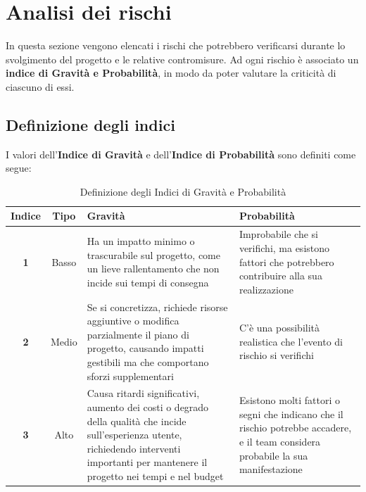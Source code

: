 \documentclass{article}
\begin{document}
\section{Analisi dei rischi}
In questa sezione vengono elencati i rischi che potrebbero verificarsi durante lo svolgimento del progetto e le relative contromisure. Ad ogni rischio è associato un \textbf{indice di Gravità e Probabilità},
in modo da poter valutare la criticità di ciascuno di essi.
\subsection{Definizione degli indici}
I valori dell'\textbf{Indice di Gravità} e dell'\textbf{Indice di Probabilità} sono definiti come segue:
\begin{table}[h!]
    \centering
    \begin{tabular}{|c|c|p{6cm}|p{6cm}|}
        \hline
        \textbf{Indice} & \textbf{Tipo} & \textbf{Gravità} & \textbf{Probabilità} \\
        \hline
        \textbf{1} & Basso & Ha un impatto minimo o trascurabile sul progetto, come un lieve rallentamento che non incide sui tempi di consegna & Improbabile che si verifichi, ma esistono fattori che potrebbero contribuire alla sua realizzazione \\
        \hline
        \textbf{2} & Medio & Se si concretizza, richiede risorse aggiuntive o modifica parzialmente il piano di progetto, causando impatti gestibili ma che comportano sforzi supplementari & C'è una possibilità realistica che l'evento di rischio si verifichi \\
        \hline
        \textbf{3} & Alto & Causa ritardi significativi, aumento dei costi o degrado della qualità che incide sull’esperienza utente, richiedendo interventi importanti per mantenere il progetto nei tempi e nel budget & Esistono molti fattori o segni che indicano che il rischio potrebbe accadere, e il team considera probabile la sua manifestazione \\
        \hline
    \end{tabular}
    \caption{Definizione degli Indici di Gravità e Probabilità}
    \label{tab:definizione_indici}
\end{table}
    
\end{document}

